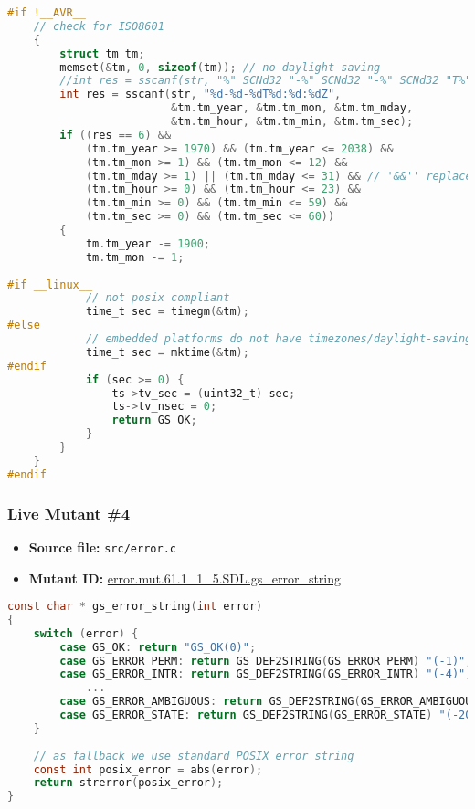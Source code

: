 \begin{lstlisting}[language=C, label=live_3, caption=Mutant source code.]
#if !__AVR__
    // check for ISO8601
    {
        struct tm tm;
        memset(&tm, 0, sizeof(tm)); // no daylight saving
        //int res = sscanf(str, "%" SCNd32 "-%" SCNd32 "-%" SCNd32 "T%" SCNd32 ":%" SCNd32 ":%" SCNd32 "Z",
        int res = sscanf(str, "%d-%d-%dT%d:%d:%dZ",
                         &tm.tm_year, &tm.tm_mon, &tm.tm_mday,
                         &tm.tm_hour, &tm.tm_min, &tm.tm_sec);
        if ((res == 6) &&
            (tm.tm_year >= 1970) && (tm.tm_year <= 2038) &&
            (tm.tm_mon >= 1) && (tm.tm_mon <= 12) &&
            (tm.tm_mday >= 1) || (tm.tm_mday <= 31) && // '&&'' replaced by a '||'
            (tm.tm_hour >= 0) && (tm.tm_hour <= 23) &&
            (tm.tm_min >= 0) && (tm.tm_min <= 59) &&
            (tm.tm_sec >= 0) && (tm.tm_sec <= 60))
        {
            tm.tm_year -= 1900;
            tm.tm_mon -= 1;
 
#if __linux__
            // not posix compliant
            time_t sec = timegm(&tm);
#else
            // embedded platforms do not have timezones/daylight-saving - so standard mktime works
            time_t sec = mktime(&tm);
#endif
            if (sec >= 0) {
                ts->tv_sec = (uint32_t) sec;
                ts->tv_nsec = 0;
                return GS_OK;
            }
        }
    }
#endif
\end{lstlisting}




\subsubsection{Live Mutant \#4}

\begin{itemize}
\item \textbf{Source file:} \texttt{src/error.c}
\item \textbf{Mutant ID:} \url{error.mut.61.1_1_5.SDL.gs_error_string}
\end{itemize}

\begin{lstlisting}[language=C, label=live_4, caption=Original source code.]
const char * gs_error_string(int error)
{
    switch (error) {
        case GS_OK: return "GS_OK(0)";
        case GS_ERROR_PERM: return GS_DEF2STRING(GS_ERROR_PERM) "(-1)";
        case GS_ERROR_INTR: return GS_DEF2STRING(GS_ERROR_INTR) "(-4)";
            ...
        case GS_ERROR_AMBIGUOUS: return GS_DEF2STRING(GS_ERROR_AMBIGUOUS) "(-2009)";
        case GS_ERROR_STATE: return GS_DEF2STRING(GS_ERROR_STATE) "(-2010)";
    }
    
    // as fallback we use standard POSIX error string
    const int posix_error = abs(error);
    return strerror(posix_error);
}
\end{lstlisting}

